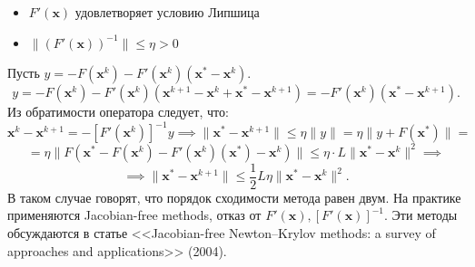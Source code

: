 \begin{itemize}
	\item $F'(\mathbf{x})$ удовлетворяет условию Липшица
	\item $\|(F'(\mathbf{x}))^{-1}\| \leq \eta > 0$
\end{itemize}
Пусть $y = -F(\mathbf{x}^k) - F'(\mathbf{x}^k)(\mathbf{x}^* - \mathbf{x}^k)$. 
\[
	y = -F(\mathbf{x}^k) - F'(\mathbf{x}^k)(\mathbf{x}^{k+1} - \mathbf{x}^k + \mathbf{x}^* - \mathbf{x}^{k + 1}) = -F'(\mathbf{x}^k)(\mathbf{x}^*-\mathbf{x}^{k+1}).
\]
Из обратимости оператора следует, что:
\[
	\mathbf{x}^k - \mathbf{x}^{k + 1} = -[F'(\mathbf{x}^k)]^{-1}y \implies \|\mathbf{x}^* - \mathbf{x}^{k + 1}\| \leq \eta\|y\| = \eta\|y + F(\mathbf{x}^*)\| =
\]
\[
	= \eta \|F(\mathbf{x}^* - F(\mathbf{x}^k) - F'(\mathbf{x}^k)(\mathbf{x}^*) - \mathbf{x}^k)\| \leq \eta \cdot L \|\mathbf{x}^* - \mathbf{x}^k\|^2 \implies
\]
\[
	\implies \| \mathbf{x}^* - \mathbf{x}^{k + 1}\| \leq \frac{1}{2}L\eta\|\mathbf{x}^* - \mathbf{x}^k\|^2.
\]
В таком случае говорят, что порядок сходимости метода равен двум.
На практике применяются Jacobian-free methods, отказ от $F'(\mathbf{x}), [F'(\mathbf{x})]^{-1}$. Эти методы обсуждаются в статье <<Jacobian-free Newton–Krylov methods: a survey of approaches and applications>> (2004).
